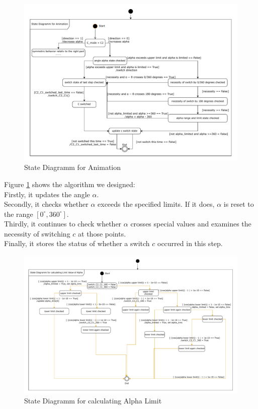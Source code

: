 \documentclass{article}
\begin{document}
\begin{itemize}
	\begin{figure}[h]
		\centering
		\includegraphics[width=\textwidth]{./figures/animation_state_diagramm_1.pdf}
		\caption{State Diagramm for Animation}
		\label{fig:state_diagramm_of_animation_alpha}
	\end{figure}

	Figure \ref{fig:state_diagramm_of_animation_alpha} shows the algorithm we designed:\\
	Firstly, it updates the angle \(\alpha\).\\
	Secondly, it checks whether \(\alpha\) exceeds the specified limits. If it does, \(\alpha\) is reset to the range \([0^\circ, 360^\circ]\).\\
	Thirdly, it continues to check whether \(\alpha\) crosses special values and examines the necessity of switching \(c\) at those points.\\
	Finally, it stores the status of whether a switch \(c\) occurred in this step.

	\begin{figure}[h]
		\centering
		\includegraphics[width=\textwidth]{./figures/state_diagramm_calculate_alpha_limit_1.pdf}
		\caption{State Diagramm for calculating Alpha Limit}
		\label{fig:state_diagramm_calculate_alpha_limit}
	\end{figure}


\end{itemize}
\end{document}
